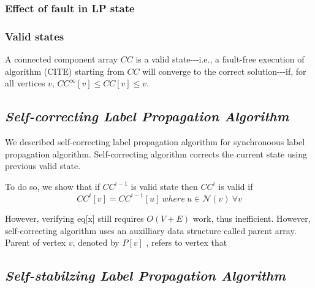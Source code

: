 \subsubsection*{Effect of fault in LP state}

\subsubsection*{Valid states}
\begin{thm}
A connected component array $CC$ is a valid state-{}-{}-i.e., a fault-free
execution of algorithm (CITE) starting from $CC$ will converge to
the correct solution-{}-{}-if, for all vertices $v$, $CC^{\infty}[v]\leq CC[v]\leq v$.
\end{thm}

\subsection{\emph{Self-correcting Label Propagation Algorithm}}

We described self-correcting label propagation algorithm for synchronoous
label propagation algorithm. Self-correcting algorithm corrects the
current state using previous valid state. 

To do so, we show that if $CC^{i-1}$ is valid state then $CC^{i}$
is valid if 
\begin{equation}
CC^{i}[v]=CC^{i-1}[u]\ where\ u\in\mathcal{N}(v)\ \forall v
\end{equation}

However, verifying eq{[}x{]} still requires $O(V+E)$ work, thus inefficient.
However, self-correcting algorithm uses an auxilliary data structure
called parent array. Parent of vertex $v$, denoted by $P[v]$ , refers
to vertex that 

\subsection{\emph{Self-stabilzing Label Propagation Algorithm} }

